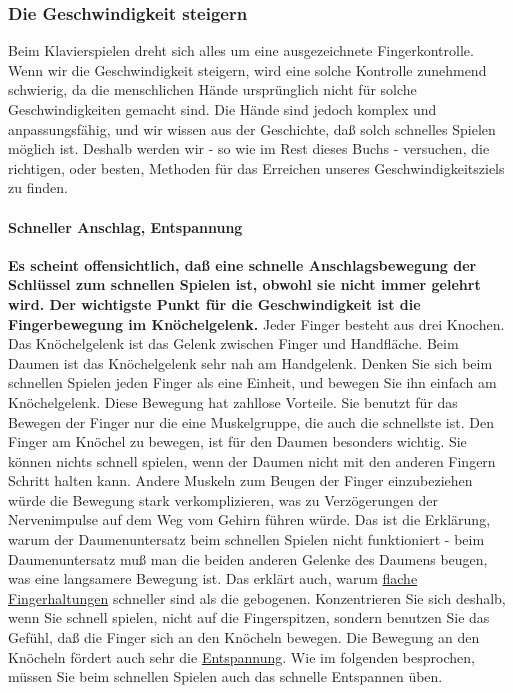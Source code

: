 
\subsubsection{Die Geschwindigkeit steigern}
\label{c1iii7i}

Beim Klavierspielen dreht sich alles um eine ausgezeichnete Fingerkontrolle.
Wenn wir die Geschwindigkeit steigern, wird eine solche Kontrolle zunehmend schwierig, da die menschlichen Hände ursprünglich nicht für solche Geschwindigkeiten gemacht sind.
Die Hände sind jedoch komplex und anpassungsfähig, und wir wissen aus der Geschichte, daß solch schnelles Spielen möglich ist.
Deshalb werden wir - so wie im Rest dieses Buchs - versuchen, die richtigen, oder besten, Methoden für das Erreichen  unseres Geschwindigkeitsziels zu finden.


\paragraph{Schneller Anschlag, Entspannung}
\label{c1iii7iAnschlag}

\textbf{Es scheint offensichtlich, daß eine schnelle Anschlagsbewegung der Schlüssel zum schnellen Spielen ist, obwohl sie nicht immer gelehrt wird.
Der wichtigste Punkt für die Geschwindigkeit ist die Fingerbewegung im Knöchelgelenk.}
Jeder Finger besteht aus drei Knochen.
Das Knöchelgelenk ist das Gelenk zwischen Finger und Handfläche.
Beim Daumen ist das Knöchelgelenk sehr nah am Handgelenk.
Denken Sie sich beim schnellen Spielen jeden Finger als eine Einheit, und bewegen Sie ihn einfach am Knöchelgelenk.
Diese Bewegung hat zahllose Vorteile.
Sie benutzt für das Bewegen der Finger nur die eine Muskelgruppe, die auch die schnellste ist.
Den Finger am Knöchel zu bewegen, ist für den Daumen besonders wichtig.
Sie können nichts schnell spielen, wenn der Daumen nicht mit den anderen Fingern Schritt halten kann.
Andere Muskeln zum Beugen der Finger einzubeziehen würde die Bewegung stark verkomplizieren, was zu Verzögerungen der Nervenimpulse auf dem Weg vom Gehirn führen würde.
Das ist die Erklärung, warum der Daumenuntersatz beim schnellen Spielen nicht funktioniert - beim Daumenuntersatz muß man die beiden anderen Gelenke des Daumens beugen, was eine langsamere Bewegung ist.
Das erklärt auch, warum \hyperref[c1iii4b]{flache Fingerhaltungen} schneller sind als die gebogenen.
Konzentrieren Sie sich deshalb, wenn Sie schnell spielen, nicht auf die Fingerspitzen, sondern benutzen Sie das Gefühl, daß die Finger sich an den Knöcheln bewegen.
Die Bewegung an den Knöcheln fördert auch sehr die \hyperref[c1ii14]{Entspannung}.
Wie im folgenden besprochen, müssen Sie beim schnellen Spielen auch das schnelle Entspannen üben.

